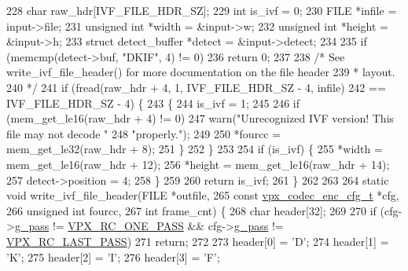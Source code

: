 \begin{DoxyCodeInclude}
{{228   \textcolor{keywordtype}{char} raw\_hdr[IVF\_FILE\_HDR\_SZ];
229   \textcolor{keywordtype}{int} is\_ivf = 0;
230   FILE *infile = input->file;
231   \textcolor{keywordtype}{unsigned} \textcolor{keywordtype}{int} *width = &input->w;
232   \textcolor{keywordtype}{unsigned} \textcolor{keywordtype}{int} *height = &input->h;
233   \textcolor{keyword}{struct }detect\_buffer *detect = &input->detect;
234 
235   \textcolor{keywordflow}{if} (memcmp(detect->buf, \textcolor{stringliteral}{"DKIF"}, 4) != 0)
236     \textcolor{keywordflow}{return} 0;
237 
238   \textcolor{comment}{/* See write\_ivf\_file\_header() for more documentation on the file header}
239 \textcolor{comment}{   * layout.}
240 \textcolor{comment}{   */}
241   \textcolor{keywordflow}{if} (fread(raw\_hdr + 4, 1, IVF\_FILE\_HDR\_SZ - 4, infile)
242       == IVF\_FILE\_HDR\_SZ - 4) \{
243     \{
244       is\_ivf = 1;
245 
246       \textcolor{keywordflow}{if} (mem\_get\_le16(raw\_hdr + 4) != 0)
247         warn(\textcolor{stringliteral}{"Unrecognized IVF version! This file may not decode "}
248              \textcolor{stringliteral}{"properly."});
249 
250       *fourcc = mem\_get\_le32(raw\_hdr + 8);
251     \}
252   \}
253 
254   \textcolor{keywordflow}{if} (is\_ivf) \{
255     *width = mem\_get\_le16(raw\_hdr + 12);
256     *height = mem\_get\_le16(raw\_hdr + 14);
257     detect->position = 4;
258   \}
259 
260   \textcolor{keywordflow}{return} is\_ivf;
261 \}
262 
263 
264 \textcolor{keyword}{static} \textcolor{keywordtype}{void} write\_ivf\_file\_header(FILE *outfile,
265                                   \textcolor{keyword}{const} \hyperlink{structvpx__codec__enc__cfg}{vpx\_codec\_enc\_cfg\_t} *cfg,
266                                   \textcolor{keywordtype}{unsigned} \textcolor{keywordtype}{int} fourcc,
267                                   \textcolor{keywordtype}{int} frame\_cnt) \{
268   \textcolor{keywordtype}{char} header[32];
269 
270   \textcolor{keywordflow}{if} (cfg->\hyperlink{structvpx__codec__enc__cfg_a70d62d87aae7d1168746577f14a6dccf}{g\_pass} != \hyperlink{group__encoder_gga476c5417f9c15a1dc5d3f68fa44c493fa7b6943a41868e8e26a77e9500f139ca1}{VPX\_RC\_ONE\_PASS} && cfg->\hyperlink{structvpx__codec__enc__cfg_a70d62d87aae7d1168746577f14a6dccf}{g\_pass} != 
      \hyperlink{group__encoder_gga476c5417f9c15a1dc5d3f68fa44c493fa65da543b956d6a9b1f301ab8cc90d3a7}{VPX\_RC\_LAST\_PASS})
271     \textcolor{keywordflow}{return};
272 
273   header[0] = \textcolor{charliteral}{'D'};
274   header[1] = \textcolor{charliteral}{'K'};
275   header[2] = \textcolor{charliteral}{'I'};
276   header[3] = \textcolor{charliteral}{'F'};
}}
\end{DoxyCodeInclude}
